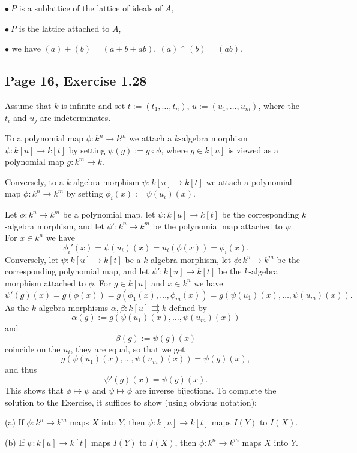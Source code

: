 \documentclass[parskip=half,fontsize=12pt]{scrartcl}%
\begin{document}
$\bullet\ P$ is a sublattice of the lattice of ideals of $A$, 

$\bullet\  P$ is the lattice attached to $A$,

$\bullet$ we have $(a)+(b)=(a+b+ab),\ (a)\cap(b)=(ab)$. 

\subsection{Page 16, Exercise 1.28}%

Assume that $k$ is infinite and set $t:=(t_1,\dots,t_n)$, $u:=(u_1,\dots,u_m)$, where the $t_i$ and $u_j$ are indeterminates. 

To a polynomial map $\phi:k^n\to k^m$ we attach a $k$-algebra morphism $\psi:k[u]\to k[t]$ by setting $\psi(g):=g\circ\phi$, where $g\in k[u]$ is viewed as a polynomial map $g:k^m\to k$. 

Conversely, to a $k$-algebra morphism $\psi:k[u]\to k[t]$ we attach a polynomial map $\phi:k^n\to k^m$ by setting $\phi_i(x):=\psi(u_i)(x)$. 

Let $\phi:k^n\to k^m$ be a polynomial map, let $\psi:k[u]\to k[t]$ be the corresponding $k$-algebra morphism, and let $\phi':k^n\to k^m$ be the polynomial map attached to $\psi$. For $x\in k^n$ we have 
$$
\phi_i'(x)=\psi(u_i)(x)=u_i(\phi(x))=\phi_i(x).
$$ 
Conversely, let $\psi:k[u]\to k[t]$ be a $k$-algebra morphism, let $\phi:k^n\to k^m$ be the corresponding polynomial map, and let $\psi':k[u]\to k[t]$ be the $k$-algebra morphism attached to $\phi$. For $g\in k[u]$ and $x\in k^n$ we have 
$$
\psi'(g)(x)=g(\phi(x))=g(\phi_1(x),\dots,\phi_m(x))=g(\psi(u_1)(x),\dots,\psi(u_m)(x)). 
$$ 
As the $k$-algebra morphisms $\alpha,\beta:k[u]\rightrightarrows k$ defined by 
$$
\alpha(g):=g(\psi(u_1)(x),\dots,\psi(u_m)(x))
$$ 
and 
$$
\beta(g):=\psi(g)(x)
$$ 
coincide on the $u_i$, they are equal, so that we get 
\begin{equation}\label{128}
g(\psi(u_1)(x),\dots,\psi(u_m)(x))=\psi(g)(x),
\end{equation}
and thus 
$$
\psi'(g)(x)=\psi(g)(x).
$$ 
This shows that $\phi\mapsto\psi$ and $\psi\mapsto\phi$ are inverse bijections. To complete the solution to the Exercise, it suffices to show (using obvious notation):

(a) If $\phi:k^n\to k^m$ maps $X$ into $Y$, then $\psi:k[u]\to k[t]$ maps $I(Y)$ to $I(X)$. 

(b) If $\psi:k[u]\to k[t]$ maps $I(Y)$ to $I(X)$, then $\phi:k^n\to k^m$ maps $X$ into $Y$. 
\end{document}
